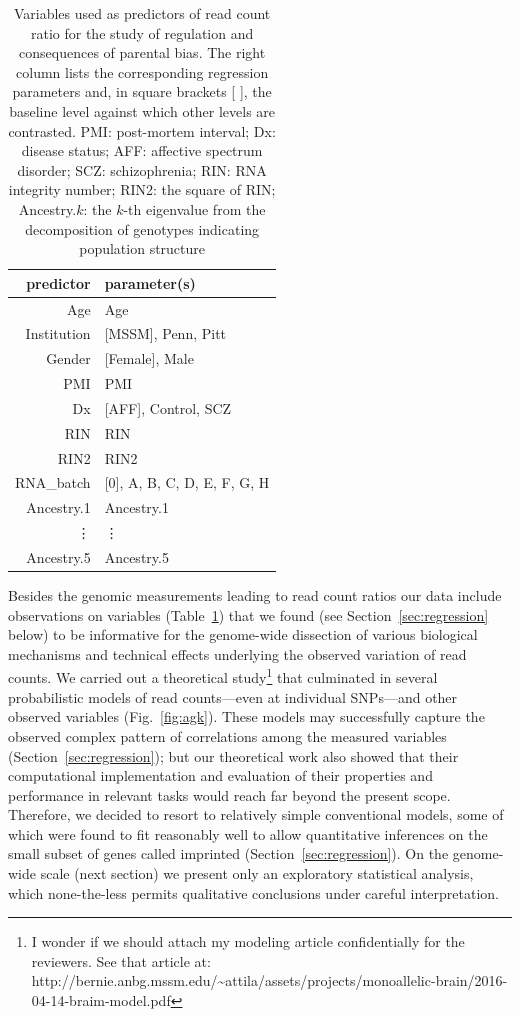 \documentclass[letterpaper]{article}
\begin{document}
\begin{table}
\begin{center}
\begin{tabular}{r|l}
predictor & parameter(s)\\
\hline
Age & Age\\
Institution & [MSSM], Penn, Pitt\\
Gender & [Female], Male\\
PMI & PMI\\
Dx & [AFF], Control, SCZ\\
RIN & RIN\\
RIN2 & RIN2\\
RNA\_batch & [0], A, B, C, D, E, F, G, H\\
Ancestry.1 & Ancestry.1\\
\vdots & \vdots \\
Ancestry.5 & Ancestry.5\\
\end{tabular}
\caption{Variables used as predictors of read count ratio for the study of
regulation and consequences of parental bias.  The right column lists the
corresponding regression parameters and, in square brackets [ ], the baseline
level against which other levels are contrasted.  PMI: post-mortem interval; Dx:
disease status; AFF: affective spectrum disorder; SCZ: schizophrenia; RIN: RNA
integrity number; RIN2: the square of RIN; Ancestry.\(k\): the \(k\)-th
eigenvalue from the decomposition of genotypes indicating population structure}
\label{tab:predictors}
\end{center}
\end{table}

Besides the genomic measurements leading to read count ratios our data include
observations on variables (Table~\ref{tab:predictors}) that we found (see
Section~\ref{sec:regression} below) to be informative for the genome-wide
dissection of various biological mechanisms and technical effects underlying
the observed variation of read counts.  We carried out a theoretical
study\footnote{I wonder if we should attach my modeling article confidentially
for the reviewers.  See that article
at:\\http://bernie.anbg.mssm.edu/\~{}attila/assets/projects/monoallelic-brain/2016-04-14-braim-model.pdf}
that culminated in several probabilistic models of read counts---even at
individual SNPs---and other observed variables (Fig.~\ref{fig:agk}).  These
models may successfully capture the observed complex pattern of correlations
among the measured variables (Section~\ref{sec:regression}); but our
theoretical work also showed that their computational implementation and
evaluation of their properties and performance in relevant tasks would reach
far beyond the present scope.  Therefore, we decided to resort to relatively
simple conventional models, some of which were found to fit reasonably well to
allow quantitative inferences on the small subset of genes called imprinted
(Section~\ref{sec:regression}).  On the genome-wide scale (next section) we
present only an exploratory statistical analysis, which none-the-less permits
qualitative conclusions under careful interpretation.
\end{document}
